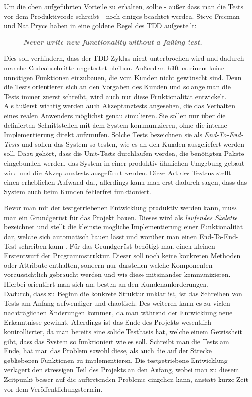 Um die oben aufgeführten Vorteile zu erhalten, sollte - außer dass man die Tests vor dem Produktivcode schreibt - noch einiges beachtet werden. Steve Freeman und Nat Pryce haben in \cite[Seite 6]{FRE10} eine goldene Regel des TDD aufgestellt:

\begin{quotation}
\textbf{\textit{\grqq Never write new functionality without a failing test.\grqq}}
\end{quotation}

Dies soll verhindern, dass der TDD-Zyklus nicht unterbrochen wird und dadurch manche Codeabschnitte ungetestet bleiben. Außerdem hilft es einem keine unnötigen Funktionen einzubauen, die vom Kunden nicht gewünscht sind. Denn die Tests orientieren sich an den Vorgaben des Kunden und solange man die Tests immer zuerst schreibt, wird auch nur diese Funktionalität entwickelt.\\
Als äußerst wichtig werden auch Akzeptanztests angesehen, die das Verhalten eines realen Anwenders möglichst genau simulieren. Sie sollen nur über die definierten Schnittstellen mit dem System kommunizieren, ohne die interne Implementierung direkt aufzurufen. Solche Tests bezeichnen sie als \textit{End-To-End-Tests} und sollen das System so testen, wie es an den Kunden ausgeliefert werden soll. Dazu gehört, dass die Unit-Tests durchlaufen werden, die benötigten Pakete eingebunden werden, das System in einer produktiv-ähnlichen Umgebung gebaut wird und die Akzeptanztests ausgeführt werden. Diese Art des Testens stellt einen erheblichen Aufwand dar, allerdings kann man erst dadurch sagen, dass das System auch beim Kunden fehlerfrei funktioniert.

Bevor man mit der testgetriebenen Entwicklung produktiv werden kann, muss man ein Grundgerüst für das Projekt bauen. Dieses wird als \textit{laufendes Skelette} \cite[orig. \textit{walking Skeleton}, Seite 32]{FRE10} bezeichnet und stellt die kleinste mögliche Implementierung einer Funktionalität dar, welche sich automatisch bauen lässt und worüber man einen End-To-End-Test schreiben kann \cite{COC04}. Für das Grundgerüst benötigt man einen kleinen Erstentwurf der Programmstruktur. Dieser soll noch keine konkreten Methoden oder Attribute enthalten, sondern nur darstellen welche Komponenten voraussichtlich gebraucht werden und wie diese miteinander kommunizieren. Hierbei orientiert man sich am besten an den Kundenanforderungen.\\
Dadurch, dass zu Beginn die konkrete Struktur unklar ist, ist das Schreiben von Tests am Anfang aufwendiger und chaotisch. Des weiteren kann es zu vielen nachträglichen Änderungen kommen, da man während der Entwicklung neue Erkenntnisse gewinnt. Allerdings ist das Ende des Projekts wesentlich kontrollierter, da man bereits eine solide Testbasis hat, welche einem Gewissheit gibt, dass das System so funktioniert wie es soll. Schreibt man die Tests am Ende, hat man das Problem sowohl diese, als auch die auf der Strecke gebliebenen Funktionen zu implementieren. Die testgetriebene Entwicklung verlagert den stressigen Teil des Projekts an den Anfang, wobei man zu diesem Zeitpunkt besser auf die auftretenden Probleme eingehen kann, anstatt kurze Zeit vor dem Veröffentlichungstermin.

